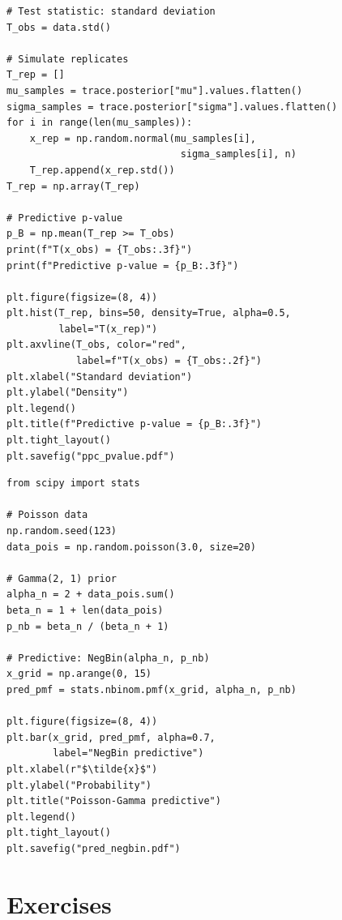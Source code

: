 \begin{codeblock}[title=\textbf{Bayesian predictive $p$-value}]
\begin{verbatim}
# Test statistic: standard deviation
T_obs = data.std()

# Simulate replicates
T_rep = []
mu_samples = trace.posterior["mu"].values.flatten()
sigma_samples = trace.posterior["sigma"].values.flatten()
for i in range(len(mu_samples)):
    x_rep = np.random.normal(mu_samples[i],
                              sigma_samples[i], n)
    T_rep.append(x_rep.std())
T_rep = np.array(T_rep)

# Predictive p-value
p_B = np.mean(T_rep >= T_obs)
print(f"T(x_obs) = {T_obs:.3f}")
print(f"Predictive p-value = {p_B:.3f}")

plt.figure(figsize=(8, 4))
plt.hist(T_rep, bins=50, density=True, alpha=0.5,
         label="T(x_rep)")
plt.axvline(T_obs, color="red",
            label=f"T(x_obs) = {T_obs:.2f}")
plt.xlabel("Standard deviation")
plt.ylabel("Density")
plt.legend()
plt.title(f"Predictive p-value = {p_B:.3f}")
plt.tight_layout()
plt.savefig("ppc_pvalue.pdf")
\end{verbatim}
\end{codeblock}

\begin{codeblock}[title=\textbf{Poisson--Gamma predictive (negative binomial)}]
\begin{verbatim}
from scipy import stats

# Poisson data
np.random.seed(123)
data_pois = np.random.poisson(3.0, size=20)

# Gamma(2, 1) prior
alpha_n = 2 + data_pois.sum()
beta_n = 1 + len(data_pois)
p_nb = beta_n / (beta_n + 1)

# Predictive: NegBin(alpha_n, p_nb)
x_grid = np.arange(0, 15)
pred_pmf = stats.nbinom.pmf(x_grid, alpha_n, p_nb)

plt.figure(figsize=(8, 4))
plt.bar(x_grid, pred_pmf, alpha=0.7,
        label="NegBin predictive")
plt.xlabel(r"$\tilde{x}$")
plt.ylabel("Probability")
plt.title("Poisson-Gamma predictive")
plt.legend()
plt.tight_layout()
plt.savefig("pred_negbin.pdf")
\end{verbatim}
\end{codeblock}

\section{Exercises}

